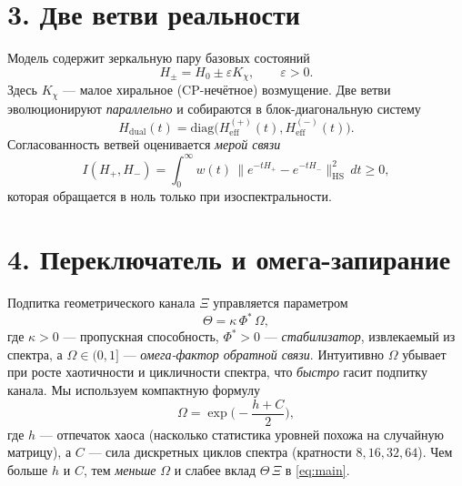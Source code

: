 \documentclass[a4paper,12pt]{article}
\begin{document}
\section*{3. Две ветви реальности}
Модель содержит зеркальную пару базовых состояний
\begin{equation}\label{eq:branches}
H_\pm = H_0 \pm \varepsilon K_\chi,\qquad \varepsilon>0.
\end{equation}
Здесь $K_\chi$ --- малое хиральное (CP-нечётное) возмущение.
Две ветви эволюционируют \emph{параллельно} и собираются в блок-диагональную систему
\begin{equation}
H_{\mathrm{dual}}(t)=\mathrm{diag}\!\big(H_{\mathrm{eff}}^{(+)}(t),H_{\mathrm{eff}}^{(-)}(t)\big).
\end{equation}
Согласованность ветвей оценивается \emph{мерой связи}
\begin{equation}\label{eq:coupling}
I(H_+,H_-)=\int_0^\infty w(t)\,\big\|e^{-tH_+}-e^{-tH_-}\big\|_{\mathrm{HS}}^2\,dt\ge 0,
\end{equation}
которая обращается в ноль только при изоспектральности.

\section*{4. Переключатель и омега-запирание}
Подпитка геометрического канала $\Xi$ управляется параметром
\begin{equation}\label{eq:theta}
\Theta=\kappa\,\Phi^\ast\,\Omega,
\end{equation}
где $\kappa>0$ --- пропускная способность, $\Phi^\ast>0$ --- \emph{стабилизатор}, извлекаемый из спектра, а $\Omega\in(0,1]$ --- \emph{омега-фактор обратной связи}.
Интуитивно $\Omega$ убывает при росте хаотичности и цикличности спектра, что \emph{быстро} гасит подпитку канала.
Мы используем компактную формулу
\begin{equation}\label{eq:omega}
\Omega=\exp\!\Big(-\frac{h+C}{2}\Big),
\end{equation}
где $h$ --- отпечаток хаоса (насколько статистика уровней похожа на случайную матрицу), а $C$ --- сила дискретных циклов спектра (кратности $8,16,32,64$).
Чем больше $h$ и $C$, тем \emph{меньше} $\Omega$ и слабее вклад $\Theta\,\Xi$ в \eqref{eq:main}.
\end{document}
